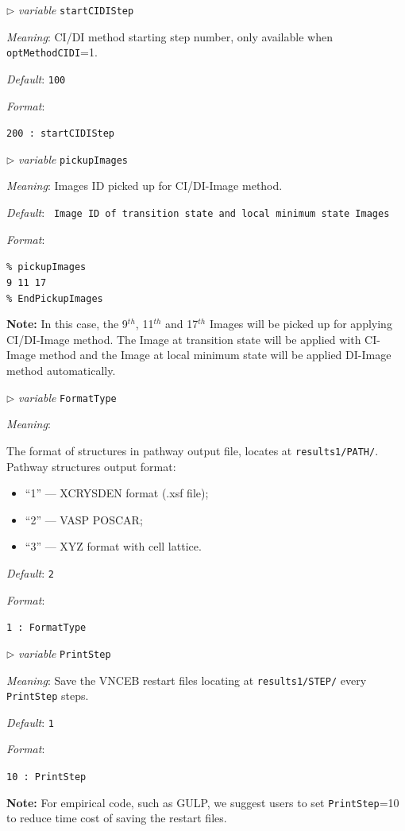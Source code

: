 \documentclass[12pt]{article}
\newcommand{\keyword}[1]{\texttt{#1}}
\newcommand{\file}[1]{\texttt{#1}}
\newcommand{\paramacro}[6]{
\vspace{0.5cm}
$\triangleright$ \emph{variable} {\color{blue} \texttt{#1}}

\emph{Meaning}: {#2}

{#3}

\emph{Default}: \texttt{#4}

\emph{Format}:

{\addtolength{\leftskip}{10mm} 
\texttt{#5}
\par}


{\small #6}

}
\begin{document}
\paramacro{startCIDIStep}{CI/DI method starting step number, only available when
\keyword{optMethodCIDI}=1.} {}{100}{200  : startCIDIStep}{}


\paramacro{pickupImages}{Images ID picked up for CI/DI-Image method. }{}{\rm
Image ID of transition state and  local minimum state Images}{\% pickupImages \\
9 11 17 \\
\% EndPickupImages}{ \textbf{Note:} In this case, the 9$^{th}$, 11$^{th}$ and
17$^{th}$ Images will be picked up for applying CI/DI-Image method. The Image at
transition state will be applied with CI-Image method and the Image at local
minimum state will be applied DI-Image method automatically.}

\paramacro{FormatType}{ The format of structures in pathway output file, locates
at \file{results1/PATH/}. Pathway structures output format:
\begin{itemize}
  \item ``1'' --- XCRYSDEN format (.xsf file);
  \item ``2'' --- VASP POSCAR;
  \item ``3'' --- XYZ format with cell lattice.
\end{itemize}
}
{}{2}{1  : FormatType}{}

\paramacro{PrintStep}{Save the VNCEB restart files locating at
\file{results1/STEP/} every \keyword{PrintStep} steps.}{}{1}{10  : PrintStep}
{\textbf{Note:} For empirical code, such as GULP, we suggest users to set
\keyword{PrintStep}=10 to reduce time cost of saving the restart files.}
\end{document}
